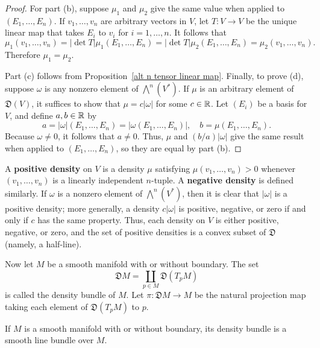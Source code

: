 \begin{proof}
For part (b), suppose $\mu_1$ and $\mu_2$ give the same value when applied to $(E_1,\dots,E_n)$. If $v_1,\dots,v_n$ are arbitrary vectors 
in $V$, let $T:V\to V$ be the unique linear map that takes $E_i$ to $v_i$ for $i=1,\dots,n$. It follows that
\[\mu_1(v_1,\dots,v_n)=|\det T|\mu_1(E_1,\dots,E_n)=|\det T|\mu_2(E_1,\dots,E_n)=\mu_2(v_1,\dots,v_n).\]
Therefore $\mu_1=\mu_2$.\par
Part (c) follows from Proposition~\ref{alt n tensor linear map}. Finally, to prove (d), suppose $\omega$ is any nonzero element of $\bigwedge^n(V^*)$. 
If $\mu$ is an arbitrary element of $\mathfrak{D}(V)$, it suffices to show that $\mu=c|\omega|$ for some $c\in\mathbb{R}$. Let $(E_i)$ be a basis for $V$, and define $a,b\in\mathbb{R}$ 
by
\[a=|\omega|(E_1,\dots,E_n)=|\omega(E_1,\dots,E_n)|,\quad b=\mu(E_1,\dots,E_n).\]
Because $\omega\neq 0$, it follows that $a\neq 0$. Thus, $\mu$ and $(b/a)|\omega|$ give the same result when applied to $(E_1,\dots,E_n)$, so they are equal by part (b).
\end{proof}
A \textbf{positive density} on $V$ is a density $\mu$ satisfying $\mu(v_1,\dots,v_n)>0$ whenever $(v_1,\dots,v_n)$ is a linearly independent $n$-tuple. A \textbf{negative density} 
is defined similarly. If $\omega$ is a nonzero element of $\bigwedge^n(V^*)$, then it is clear that $|\omega|$ is a positive density; more generally, a density 
$c|\omega|$ is positive, negative, or zero if and only if $c$ has the same property. Thus, each density on $V$ is either positive, negative, or zero, and the set of 
positive densities is a convex subset of $\mathfrak{D}$ (namely, a half-line).\par
Now let $M$ be a smooth manifold with or without boundary. The set
\[\mathfrak{D}M=\coprod_{p\in M}\mathfrak{D}(T_pM)\]
is called the density bundle of $M$. Let $\pi:\mathfrak{D}M\to M$ be the natural projection map taking each element of $\mathfrak{D}(T_pM)$ to $p$.
\begin{proposition}
If $M$ is a smooth manifold with or without boundary, its density bundle is a smooth line bundle over $M$.
\end{proposition}
